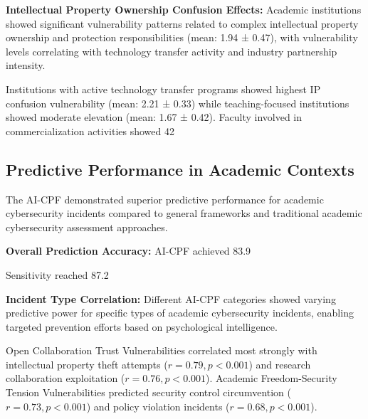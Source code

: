 \documentclass[10pt, twocolumn]{article}
\begin{document}
\textbf{Intellectual Property Ownership Confusion Effects:} Academic institutions showed significant vulnerability patterns related to complex intellectual property ownership and protection responsibilities (mean: 1.94 ± 0.47), with vulnerability levels correlating with technology transfer activity and industry partnership intensity.

Institutions with active technology transfer programs showed highest IP confusion vulnerability (mean: 2.21 ± 0.33) while teaching-focused institutions showed moderate elevation (mean: 1.67 ± 0.42). Faculty involved in commercialization activities showed 42%

\subsection{Predictive Performance in Academic Contexts}

The AI-CPF demonstrated superior predictive performance for academic cybersecurity incidents compared to general frameworks and traditional academic cybersecurity assessment approaches.

\textbf{Overall Prediction Accuracy:} AI-CPF achieved 83.9%

Sensitivity reached 87.2%

\textbf{Incident Type Correlation:} Different AI-CPF categories showed varying predictive power for specific types of academic cybersecurity incidents, enabling targeted prevention efforts based on psychological intelligence.

Open Collaboration Trust Vulnerabilities correlated most strongly with intellectual property theft attempts ($r = 0.79, p < 0.001$) and research collaboration exploitation ($r = 0.76, p < 0.001$). Academic Freedom-Security Tension Vulnerabilities predicted security control circumvention ($r = 0.73, p < 0.001$) and policy violation incidents ($r = 0.68, p < 0.001$).
\end{document}
